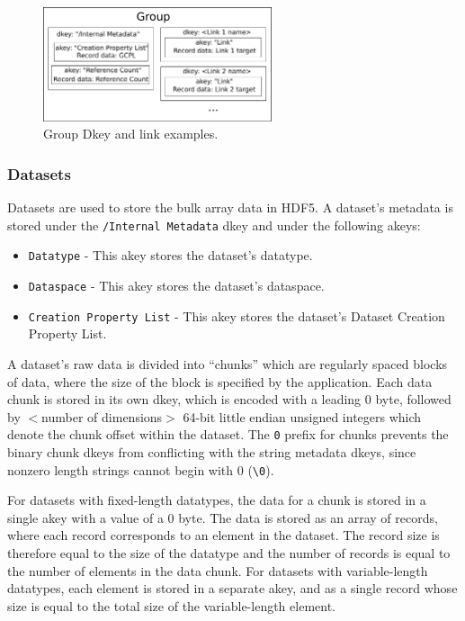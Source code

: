 \begin{figure}
\includegraphics[width=0.6\textwidth]{pics/group_figure}
\caption{Group Dkey and link examples.}
\label{fig:group}
\end{figure}

\newpage

\subsubsection{Datasets}

Datasets are used to store the bulk array data in HDF5. A dataset's metadata is stored under the \verb+/Internal Metadata+ dkey and under the following akeys:

\begin{itemize}
    \item \verb+Datatype+ - This akey stores the dataset's datatype.
    \item \verb+Dataspace+ - This akey stores the dataset's dataspace.
    \item \verb+Creation Property List+ - This akey stores the dataset's Dataset Creation Property List.
\end{itemize}

A dataset's raw data is divided into ``chunks'' which are regularly spaced blocks of data, where the size of the block is specified by the application. Each data chunk is stored in its own dkey, which is encoded with a leading 0 byte, followed by $<$number of dimensions$>$ 64-bit little endian unsigned integers which denote the chunk offset within the dataset. The \verb+0+ prefix for chunks prevents the binary chunk dkeys from conflicting with the string metadata dkeys, since nonzero length strings cannot begin with 0 (\verb+\0+).

For datasets with fixed-length datatypes, the data for a chunk is stored in a single akey with a value of a 0 byte. The data is stored as an array of records, where each record corresponds to an element in the dataset. The record size is therefore equal to the size of the datatype and the number of records is equal to the number of elements in the data chunk. For datasets with variable-length datatypes, each element is stored in a separate akey, and as a single record whose size is equal to the total size of the variable-length element.

